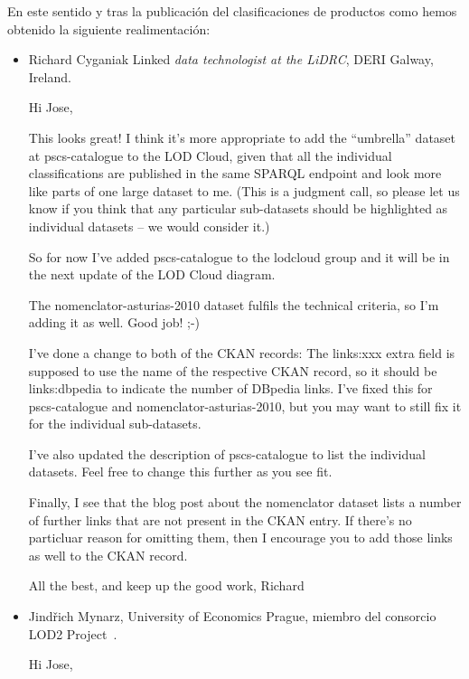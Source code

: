 En este sentido y tras la publicación del clasificaciones de productos como \linkeddata hemos obtenido la siguiente
realimentación:
\begin{itemize}

 \item Richard Cyganiak Linked \textit{data technologist at the LiDRC}, DERI Galway, Ireland.

\begin{Frame} 
\begin{itshape}
Hi Jose,

This looks great! I think it's more appropriate to add the “umbrella” dataset at
pscs-catalogue to the LOD Cloud, given that all the individual classifications
are published in the same SPARQL endpoint and look more like parts of one large
dataset to me. (This is a judgment call, so please let us know if you think that
any particular sub-datasets should be highlighted as individual datasets – we
would consider it.)

So for now I've added pscs-catalogue to the lodcloud group and it will be in the
next update of the LOD Cloud diagram.

The nomenclator-asturias-2010 dataset fulfils the technical criteria, so I'm
adding it as well. Good job! ;-)

I've done a change to both of the CKAN records: The links:xxx extra field is
supposed to use the name of the respective CKAN record, so it should be
links:dbpedia to indicate the number of DBpedia links. I've fixed this for
pscs-catalogue and nomenclator-asturias-2010, but you may want to still fix it
for the individual sub-datasets.

I've also updated the description of pscs-catalogue to list the individual
datasets. Feel free to change this further as you see fit.

Finally, I see that the blog post about the nomenclator dataset lists a number
of further links that are not present in the CKAN entry. If there's no
particluar reason for omitting them, then I encourage you to add those links as
well to the CKAN record.

All the best, and keep up the good work,
Richard
\end{itshape}
\end{Frame}

\item Jindřich Mynarz, University of Economics Prague, miembro del consorcio LOD2 Project~\cite{lod2-project}.

\begin{Frame}
\begin{itshape}
Hi Jose,


\end{itshape}
\end{Frame}
\end{itemize}
